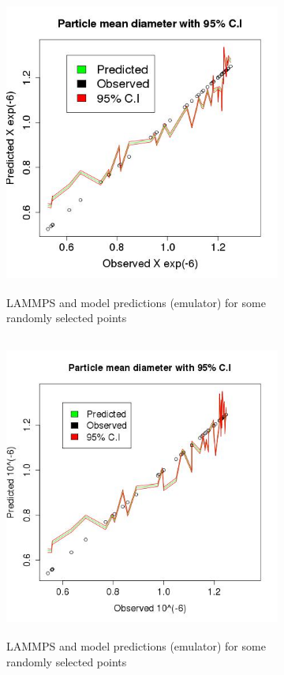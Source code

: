 \documentclass[12pt,titlepage]{report}
\theoremstyle{definition}
\theoremstyle{remark}
\begin{document}
\begin{figure}[!ht]
\begin{subfigure}[b]{.5\textwidth}
\includegraphics[height=10cm,width=1.1\textwidth]{res_plots/wole1}
\caption{LAMMPS and model predictions (emulator) for some randomly selected points}
\label{myfigg9a1}
\end{subfigure}\hspace*{1em}
\begin{subfigure}[b]{.5\textwidth}
\includegraphics[height=10cm,width=1.1\textwidth]{res_plots/wole2}
\caption{LAMMPS and model predictions (emulator) for some randomly selected points}
\label{myfigg9a1}
\end{subfigure}
\begin{subfigure}[b]{.5\textwidth}

\end{subfigure}
\end{figure}
\end{document}
